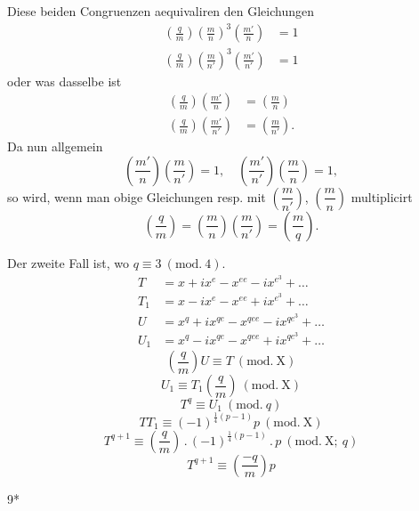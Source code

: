 \par\indent Diese beiden Congruenzen aequivaliren den Gleichungen
\[
\begin{aligned}
\left(\frac qm\right)\left(\frac mn\right)^3\left(\frac{m'}n\right)&=1\\
\left(\frac qm\right)\left(\frac m{n'}\right)^3\left(\frac{m'}{n'}\right)&=1
\end{aligned}
\]
\noindent oder was dasselbe ist
\[
\begin{aligned}
\left(\frac qm\right)\left(\frac{m'}n\right)&=\left(\frac mn\right)\\
\left(\frac qm\right)\left(\frac{m'}{n'}\right)&=\left(\frac m{n'}\right).
\end{aligned}
\]
\noindent Da nun allgemein
\[
\left(\frac{m'}n\right)\left(\frac m{n'}\right)=1,\quad\left(\frac{m'}{n'}\right)\left(\frac mn\right)=1,
\]
\noindent so wird, wenn man obige Gleichungen resp. mit $\left(\dfrac m{n'}\right)$, $\left(\dfrac mn\right)$ multiplicirt
\[
\left(\frac qm\right)=\left(\frac mn\right)\left(\frac m{n'}\right)=\left(\frac mq\right).
\]
\par\indent Der zweite Fall ist, wo $q\equiv3\ (\mathrm{mod.}\ 4)$.
\[
\begin{aligned}
T&=x+ix^e-x^{ee}-ix^{e^3}+\ldots\\
T_1&=x-ix^e-x^{ee}+ix^{e^3}+\ldots\\
U&=x^q+ix^{qe}-x^{qee}-ix^{qe^3}+\ldots\\
U_1&=x^q-ix^{qe}-x^{qee}+ix^{qe^3}+\ldots
\end{aligned}
\]
\[
\left(\frac qm\right)U\equiv T\ (\mathrm{mod.}\ \mathrm X)
\]
\[
U_1\equiv T_1\left(\frac qm\right)\ (\mathrm{mod.}\ \mathrm X)
\]
\[
T^q\equiv U_1\ (\mathrm{mod.}\ q)
\]
\[
TT_1\equiv(-1)^{\frac14(p-1)}p\ (\mathrm{mod.}\ \mathrm X)
\]
\[
T^{q+1}\equiv\left(\frac qm\right)\mathpunct{.}(-1)^{\frac14(p-1)}\mathpunct{.}p\ (\mathrm{mod.}\ \mathrm X;\ q)
\]
\[
T^{q+1}\equiv\left(\frac{-q}m\right)p
\]
\par\vfill\noindent\hfill9*\par\clearpage


